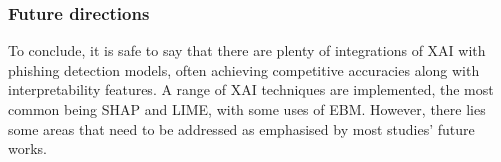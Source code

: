
\subsubsection*{Future directions}
To conclude, it is safe to say that there are plenty of integrations of XAI with phishing detection models, often achieving competitive accuracies along with interpretability features. A range of XAI techniques are implemented, the most common being SHAP and LIME, with some uses of EBM. However, there lies some areas that need to be addressed as emphasised by most studies' future works.

